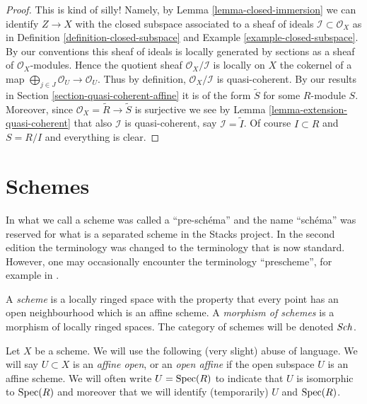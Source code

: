 \begin{proof}
This is kind of silly! Namely, by Lemma \ref{lemma-closed-immersion}
we can identify $Z \to X$ with the closed subspace associated to
a sheaf of ideals $\mathcal{I} \subset \mathcal{O}_X$ as in
Definition \ref{definition-closed-subspace} and
Example \ref{example-closed-subspace}.
By our conventions this sheaf of ideals is locally generated
by sections as a sheaf of $\mathcal{O}_X$-modules.
Hence the quotient sheaf $\mathcal{O}_X / \mathcal{I}$
is locally on $X$ the cokernel
of a map $\bigoplus_{j \in J} \mathcal{O}_U \to \mathcal{O}_U$.
Thus by definition, $\mathcal{O}_X / \mathcal{I}$ is quasi-coherent.
By our results in Section \ref{section-quasi-coherent-affine}
it is of the form $\widetilde S$ for some $R$-module $S$.
Moreover, since $\mathcal{O}_X = \widetilde R \to \widetilde S$
is surjective we see by Lemma \ref{lemma-extension-quasi-coherent}
that also $\mathcal{I}$ is quasi-coherent, say $\mathcal{I} = \widetilde I$.
Of course $I \subset R$ and $S = R/I$ and everything is clear.
\end{proof}













\section{Schemes}
\label{section-schemes}

\begin{definition}
\label{definition-scheme}
\begin{history}
In \cite{EGA1} what we call a scheme was called a ``pre-sch\'ema'' and the
name ``sch\'ema'' was reserved for what is a separated scheme in the
Stacks project. In the second edition \cite{EGA1-second} the terminology
was changed to the terminology that is now standard. However, one may
occasionally encounter the terminology ``prescheme'', for example in
\cite{Murre-lectures}.
\end{history}
A {\it scheme} is a locally ringed space with the property that
every point has an open neighbourhood which is an affine scheme.
A {\it morphism of schemes} is a morphism of locally
ringed spaces. The category of schemes will be denoted
$\mathit{Sch}$.
\end{definition}

\noindent
Let $X$ be a scheme.
We will use the following (very slight) abuse of language.
We will say $U \subset X$ is an {\it affine open}, or an {\it open affine}
if the open subspace $U$ is an affine scheme. We will often
write $U = \mathop{\mathrm{Spec}}(R)$ to indicate that $U$ is isomorphic
to $\mathop{\mathrm{Spec}}(R)$ and moreover that we will identify (temporarily)
$U$ and $\mathop{\mathrm{Spec}}(R)$.

